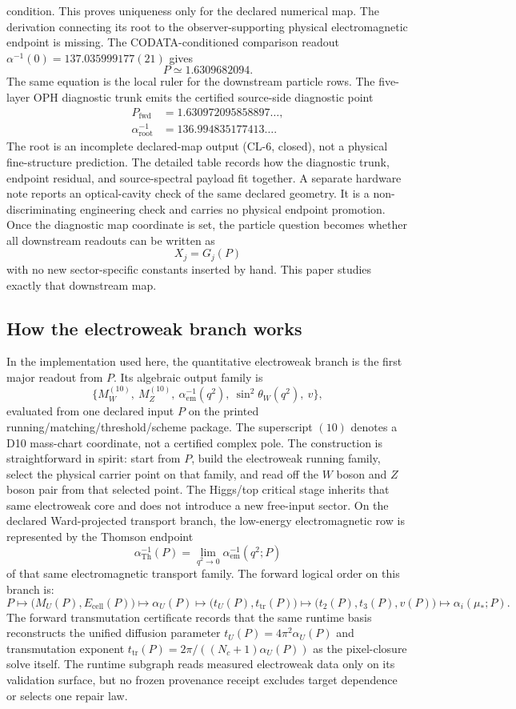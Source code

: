 \documentclass[11pt]{article}
\begin{document}
condition.
This proves uniqueness only for the declared numerical map. The derivation connecting its root to
the observer-supporting physical electromagnetic endpoint is missing.
The CODATA-conditioned comparison readout
\(\alpha^{-1}(0)=137.035999177(21)\) gives
\[
P\simeq1.6309682094.
\]
The same equation is the local ruler for the downstream particle rows. The five-layer
OPH diagnostic trunk emits the certified source-side diagnostic point
\[
\begin{aligned}
P_{\mathrm{fwd}}&=1.630972095858897\ldots,\\
\alpha_{\mathrm{root}}^{-1}
&=136.994835177413\ldots.
\end{aligned}
\]
The root is an incomplete declared-map output (CL-6, closed), not a physical fine-structure
prediction.
The detailed table records how the diagnostic trunk, endpoint residual, and
source-spectral payload fit together.
A separate hardware note reports an optical-cavity check of the same declared geometry. It is a
non-discriminating engineering check and carries no physical endpoint promotion.
Once the diagnostic map coordinate is set, the particle question becomes whether all downstream readouts
can be written as
\[
X_j = G_j(P)
\]
with no new sector-specific constants inserted by hand. This paper studies exactly that downstream
map.

\subsection{How the electroweak branch works}

In the implementation used here, the quantitative electroweak branch is the first major readout from \(P\). Its algebraic
output family is
\[
\{M_W^{(10)},\ M_Z^{(10)},\ \alpha_{\mathrm{em}}^{-1}(q^2),\ \sin^2\theta_W(q^2),\ v\},
\]
evaluated from one declared input \(P\) on the printed running/matching/threshold/scheme package.  The superscript
\((10)\) denotes a D10 mass-chart coordinate, not a certified complex pole. The construction
is straightforward in spirit: start from \(P\), build the electroweak running family, select the physical carrier point on that family, and read off the \(W\) boson and \(Z\) boson pair from that selected point. The Higgs/top critical stage
inherits that same electroweak core and does not introduce a new
free-input sector. On the declared Ward-projected transport branch, the low-energy electromagnetic row is represented by the Thomson endpoint
\[
\alpha_{\mathrm{Th}}^{-1}(P)=\lim_{q^2\to 0}\alpha_{\mathrm{em}}^{-1}(q^2;P)
\]
of that same electromagnetic transport family.
The forward logical order on this branch is:
\[
P
\longmapsto
\bigl(M_U(P),E_{\mathrm{cell}}(P)\bigr)
\longmapsto
\alpha_U(P)
\longmapsto
\bigl(t_U(P),t_{\mathrm{tr}}(P)\bigr)
\longmapsto
\bigl(t_2(P),t_3(P),v(P)\bigr)
\longmapsto
\alpha_i(\mu_\ast;P).
\]
The forward transmutation certificate records that the same runtime basis reconstructs the unified diffusion parameter \(t_U(P)=4\pi^2\alpha_U(P)\) and transmutation exponent \(t_{\mathrm{tr}}(P)=2\pi/((N_c+1)\alpha_U(P))\) as the pixel-closure solve itself. The runtime subgraph reads measured electroweak data only on its validation surface, but no frozen provenance receipt excludes target dependence or selects one repair law.
\end{document}
